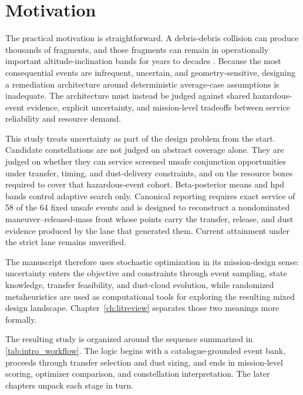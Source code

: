 \section{Motivation} \label{se:motivation}
The practical motivation is straightforward. A debris-debris collision can produce thousands of fragments, and those fragments can remain in operationally important altitude-inclination bands for years to decades \cite{ESAEnvironment2025,Krisko2014ORDEM,Harada2024NEODEEM}. Because the most consequential events are infrequent, uncertain, and geometry-sensitive, designing a remediation architecture around deterministic average-case assumptions is inadequate. The architecture must instead be judged against shared hazardous-event evidence, explicit uncertainty, and mission-level tradeoffs between service reliability and resource demand.

This study treats uncertainty as part of the design problem from the start. Candidate constellations are not judged on abstract coverage alone. They are judged on whether they can service screened unsafe conjunction opportunities under transfer, timing, and dust-delivery constraints, and on the resource boxes required to cover that hazardous-event cohort. Beta-posterior means and \gls{hpd} bands control adaptive search only. Canonical reporting requires exact service of 58 of the 64 fixed unsafe events and is designed to reconstruct a nondominated maneuver--released-mass front whose points carry the transfer, release, and dust evidence produced by the lane that generated them. Current attainment under the strict lane remains unverified.

The manuscript therefore uses stochastic optimization in its mission-design sense: uncertainty enters the objective and constraints through event sampling, state knowledge, transfer feasibility, and dust-cloud evolution, while randomized metaheuristics are used as computational tools for exploring the resulting mixed design landscape. Chapter~\ref{ch:litreview} separates those two meanings more formally.

The resulting study is organized around the sequence summarized in \cref{tab:intro_workflow}. The logic begins with a catalogue-grounded event bank, proceeds through transfer selection and dust sizing, and ends in mission-level scoring, optimizer comparison, and constellation interpretation. The later chapters unpack each stage in turn.

